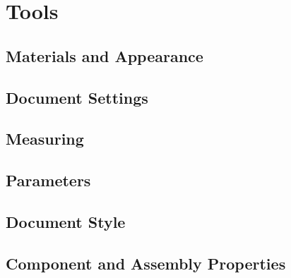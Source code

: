 \section{Tools}

\subsection{Materials and Appearance}

\subsection{Document Settings}

\subsection{Measuring}

\subsection{Parameters}

\subsection{Document Style}

\subsection{Component and Assembly Properties}